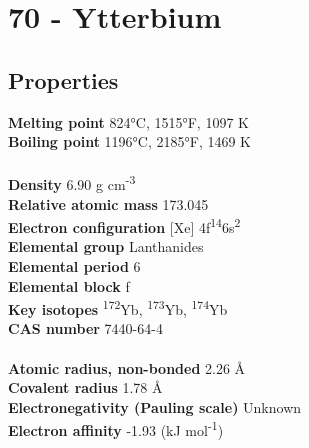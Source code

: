 \section{70 - Ytterbium}
\label{sec:elem-ytterbium}
\subsection{Properties}
\textbf{Melting point} 824°C, 1515°F, 1097 K\\
\textbf{Boiling point} 1196°C, 2185°F, 1469 K\\
\\
\textbf{Density} 6.90 g cm\textsuperscript{-3}\\
\textbf{Relative atomic mass} 173.045\\
\textbf{Electron configuration} [Xe] 4f\textsuperscript{14}6s\textsuperscript{2}\\
\textbf{Elemental group} Lanthanides\\
\textbf{Elemental period} 6\\
\textbf{Elemental block} f\\
\textbf{Key isotopes} \textsuperscript{172}Yb, \textsuperscript{173}Yb, \textsuperscript{174}Yb\\
\textbf{CAS number} 7440-64-4\\
\\
\textbf{Atomic radius, non-bonded} 2.26 Å\\
\textbf{Covalent radius} 1.78 Å\\
\textbf{Electronegativity (Pauling scale)} Unknown\\
\textbf{Electron affinity} -1.93 (kJ mol\textsuperscript{-1})\\